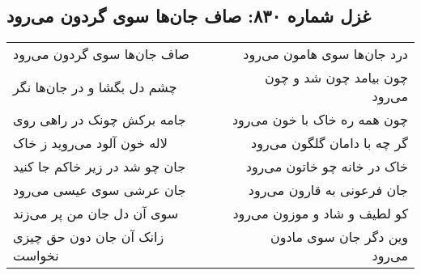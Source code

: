 \begin{center}
\section*{غزل شماره ۸۳۰: صاف جان‌ها سوی گردون می‌رود}
\label{sec:0830}
\begin{longtable}{l p{0.5cm} r}
صاف جان‌ها سوی گردون می‌رود
&&
درد جان‌ها سوی هامون می‌رود
\\
چشم دل بگشا و در جان‌ها نگر
&&
چون بیامد چون شد و چون می‌رود
\\
جامه برکش چونک در راهی روی
&&
چون همه ره خاک با خون می‌رود
\\
لاله خون آلود می‌روید ز خاک
&&
گر چه با دامان گلگون می‌رود
\\
جان چو شد در زیر خاکم جا کنید
&&
خاک در خانه چو خاتون می‌رود
\\
جان عرشی سوی عیسی می‌رود
&&
جان فرعونی به قارون می‌رود
\\
سوی آن دل جان من پر می‌زند
&&
کو لطیف و شاد و موزون می‌رود
\\
زانک آن جان دون حق چیزی نخواست
&&
وین دگر جان سوی مادون می‌رود
\\
\end{longtable}
\end{center}
